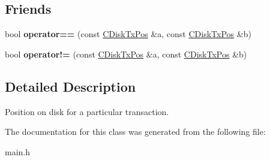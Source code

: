 \subsection*{Friends}
\begin{DoxyCompactItemize}
\item 
\mbox{\label{class_c_disk_tx_pos_aaa8e3a794737568b5413aa5f9ec00f31}} 
bool {\bfseries operator==} (const \mbox{\hyperlink{class_c_disk_tx_pos}{C\+Disk\+Tx\+Pos}} \&a, const \mbox{\hyperlink{class_c_disk_tx_pos}{C\+Disk\+Tx\+Pos}} \&b)
\item 
\mbox{\label{class_c_disk_tx_pos_a26e1b04941232ed2c09a79d65acd538f}} 
bool {\bfseries operator!=} (const \mbox{\hyperlink{class_c_disk_tx_pos}{C\+Disk\+Tx\+Pos}} \&a, const \mbox{\hyperlink{class_c_disk_tx_pos}{C\+Disk\+Tx\+Pos}} \&b)
\end{DoxyCompactItemize}


\subsection{Detailed Description}
Position on disk for a particular transaction. 

The documentation for this class was generated from the following file\+:\begin{DoxyCompactItemize}
\item 
main.\+h\end{DoxyCompactItemize}
